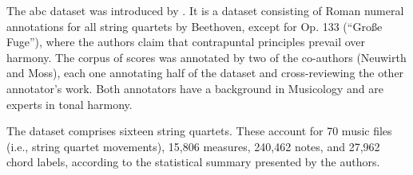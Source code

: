 
The \gls{abc} dataset was introduced by
\textcite{neuwirth2018annotated}. It is a dataset consisting
of Roman numeral annotations for all string quartets by
Beethoven, except for Op. 133 (``Gro{\ss}e Fuge''), where
the authors claim that contrapuntal principles prevail over
harmony. The corpus of scores was annotated by two of the
co-authors (Neuwirth and Moss), each one annotating half of
the dataset and cross-reviewing the other annotator's work.
Both annotators have a background in Musicology and are
experts in tonal harmony.

The dataset comprises sixteen string quartets. These account
for 70 music files (i.e., string quartet movements), 15,806
measures, 240,462 notes, and 27,962 chord labels, according
to the statistical summary presented by the authors.
